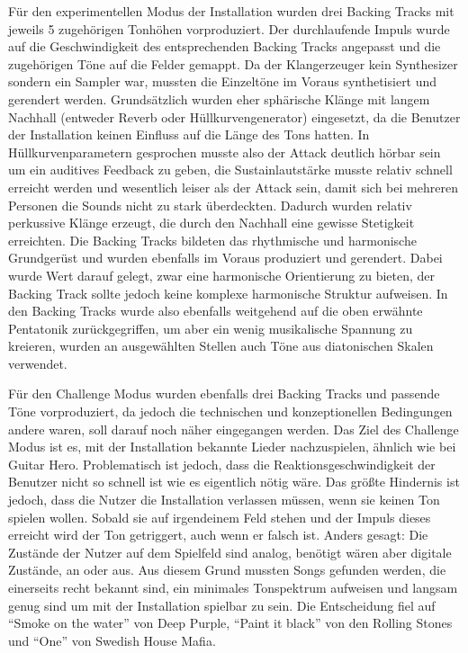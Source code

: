Für den experimentellen Modus der Installation wurden drei Backing Tracks mit jeweils 5 zugehörigen Tonhöhen vorproduziert. Der durchlaufende Impuls wurde auf die Geschwindigkeit des entsprechenden Backing Tracks angepasst und die zugehörigen Töne auf die Felder gemappt. Da der Klangerzeuger kein Synthesizer sondern ein Sampler war, mussten die Einzeltöne im Voraus synthetisiert und gerendert werden. Grundsätzlich wurden eher sphärische Klänge mit langem Nachhall (entweder Reverb oder Hüllkurvengenerator) eingesetzt, da die Benutzer der Installation keinen Einfluss auf die Länge des Tons hatten. In Hüllkurvenparametern gesprochen musste also der Attack deutlich hörbar sein um ein auditives Feedback zu geben, die Sustainlautstärke musste relativ schnell erreicht werden und wesentlich leiser als der Attack sein, damit sich bei mehreren Personen die Sounds nicht zu stark überdeckten. Dadurch wurden relativ perkussive Klänge erzeugt, die durch den Nachhall eine gewisse Stetigkeit erreichten. Die Backing Tracks bildeten das rhythmische und harmonische Grundgerüst und wurden ebenfalls im Voraus produziert und gerendert. Dabei wurde Wert darauf gelegt, zwar eine harmonische Orientierung zu bieten, der Backing Track sollte jedoch keine komplexe harmonische Struktur aufweisen. In den Backing Tracks wurde also ebenfalls weitgehend auf die oben erwähnte Pentatonik zurückgegriffen, um aber ein wenig musikalische Spannung zu kreieren, wurden an ausgewählten Stellen auch Töne aus diatonischen Skalen verwendet.

Für den Challenge Modus wurden ebenfalls drei Backing Tracks und passende Töne vorproduziert, da jedoch die technischen und konzeptionellen Bedingungen andere waren, soll darauf noch näher eingegangen werden. Das Ziel des Challenge Modus ist es, mit der Installation bekannte Lieder nachzuspielen, ähnlich wie bei Guitar Hero. Problematisch ist jedoch, dass die Reaktionsgeschwindigkeit der Benutzer nicht so schnell ist wie es eigentlich nötig wäre. Das größte Hindernis ist jedoch, dass die Nutzer die Installation verlassen müssen, wenn sie keinen Ton spielen wollen. Sobald sie auf irgendeinem Feld stehen und der Impuls dieses erreicht wird der Ton getriggert, auch wenn er falsch ist. Anders gesagt: Die Zustände der Nutzer auf dem Spielfeld sind analog, benötigt wären aber digitale Zustände, an oder aus. Aus diesem Grund mussten Songs gefunden werden, die einerseits recht bekannt sind, ein minimales Tonspektrum aufweisen und langsam genug sind um mit der Installation spielbar zu sein. Die Entscheidung fiel auf \enquote{Smoke on the water} von Deep Purple, \enquote{Paint it black} von den Rolling Stones und \enquote{One} von Swedish House Mafia.

